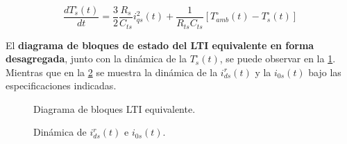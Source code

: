 \documentclass[a4paper, 10pt, onecolumn,journal]{ieeeconf}
\begin{document}
\begin{equation}
    \frac{d T^\circ_{s}(t)}{dt} = \frac{3}{2}\frac{R_{s}}{C_{ts}} i_{qs}^2(t) + \frac{1}{R_{ts}C_{ts}}\left[T^{\circ}_{amb}(t) - T_{s}^{\circ}(t)\right]
    \label{dinamica sub-sistema térmico}
\end{equation}

El \textbf{diagrama de bloques de estado del LTI equivalente en forma desagregada}, junto con la
dinámica de la $T^{\circ}_s(t)$, se puede observar en la \cref{diagrama de bloques LTI equivalente}. Mientras
que en la \cref{diagrama de bloques LTI equivalente i0s e ids} se muestra la dinámica de la
$i^r_{ds}(t)$ y la $i_{0s}(t)$ bajo las especificaciones indicadas.

\begin{figure}[thpb]
    \centering
    \begin{adjustbox}{max width=\columnwidth}
    \end{adjustbox}
    \caption{Diagrama de bloques LTI equivalente.}
    \label{diagrama de bloques LTI equivalente}
\end{figure}

\begin{figure}[thpb]
    \centering
    \begin{adjustbox}{max width=\columnwidth}
    \end{adjustbox}
    \caption{Dinámica de $i^r_{ds}(t)$ e $i_{0s}(t)$.}
    \label{diagrama de bloques LTI equivalente i0s e ids}
\end{figure}
\end{document}
